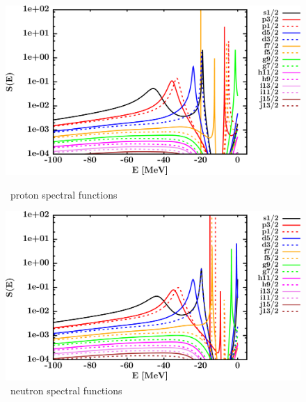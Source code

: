 \begin{figure}[hbtp]
    \centering
    \begin{minipage}{0.42\textwidth}
        \centering
        \includegraphics[width=\textwidth]{figures/ni64_protonSpectralFunctions.png}
        \caption*{\niFour\ proton spectral functions}
        \label{DOMFitData_ni64_proton_spectralFunctions}
    \end{minipage}\hspace{6pt}
    \begin{minipage}{0.42\textwidth}
        \centering
        \includegraphics[width=\linewidth]{figures/ni64_neutronSpectralFunctions.png}
        \caption*{\niFour\ neutron spectral functions}
        \label{DOMFitData_ni64_neutron_spectralFunctions}
    \end{minipage}
\end{figure}
\afterpage{\clearpage}
